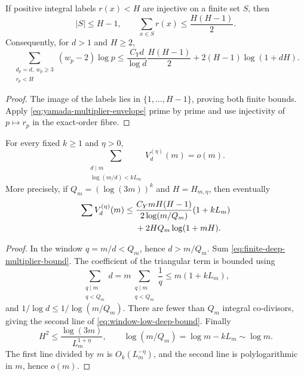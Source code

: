 \begin{lemma}
\label{lem:triangular-multiplier-energy}
If positive integral labels $r(x)<H$ are injective on a finite set $S$, then
\[
 |S|\le H-1,
 \qquad
 \sum_{x\in S}r(x)\le\frac{H(H-1)}2.
\]
Consequently, for $d>1$ and $H\ge2$,
\begin{equation}\label{eq:finite-deep-multiplier-bound}
 \sum_{\substack{d_p=d,\ w_p\ge3\\r_p<H}}(w_p-2)\log p
 \le
 \frac{C_Yd}{\log d}\frac{H(H-1)}2
 +2(H-1)\log(1+dH).
\end{equation}
\end{lemma}

\begin{proof}
The image of the labels lies in $\{1,\ldots,H-1\}$, proving both finite
bounds.  Apply \eqref{eq:yamada-multiplier-envelope} prime by prime and use
injectivity of $p\mapsto r_p$ in the exact-order fibre.
\end{proof}

\begin{theorem}
\label{thm:balanced-low-deep-negligible}
For every fixed $k\ge1$ and $\eta>0$,
\[
 \sum_{\substack{d\mid m\\\log(m/d)<kL_m}}
       V_d^{(\eta)}(m)=o(m).
\]
More precisely, if $Q_m=(\log(3m))^k$ and $H=H_{m,\eta}$, then eventually
\begin{align}
 \sum V_d^{(\eta)}(m)
 \le{}&
 \frac{C_YmH(H-1)}{2\log(m/Q_m)}(1+kL_m)
 \notag\\
 &+2HQ_m\log(1+mH).
\label{eq:window-low-deep-bound}
\end{align}
\end{theorem}

\begin{proof}
In the window $q=m/d<Q_m$, hence $d>m/Q_m$.  Sum
\eqref{eq:finite-deep-multiplier-bound}.  The coefficient of the triangular
term is bounded using
\[
 \sum_{\substack{q\mid m\\q<Q_m}}d
 =m\sum_{\substack{q\mid m\\q<Q_m}}\frac1q
 \le m(1+kL_m),
\]
and $1/\log d\le1/\log(m/Q_m)$.  There are fewer than $Q_m$ integral
co-divisors, giving the second line of
\eqref{eq:window-low-deep-bound}.  Finally
\[
 H^2\le\frac{\log(3m)}{L_m^{1+\eta}},
 \qquad \log(m/Q_m)=\log m-kL_m\sim\log m.
\]
The first line divided by $m$ is $O_k(L_m^{-\eta})$, and the second line is
polylogarithmic in $m$, hence $o(m)$.
\end{proof}

